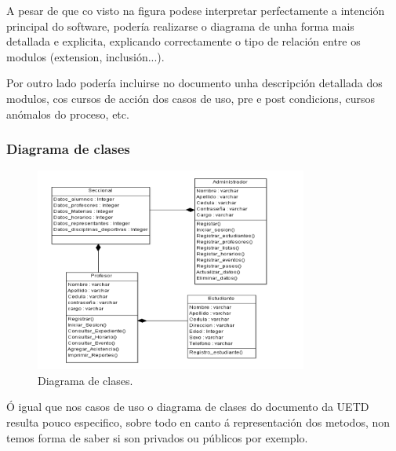 \documentclass[DIV=calc,paper=a4,fontsize=11pt,onecolumn]{scrartcl}	 %
\begin{document}
A pesar de que co visto na figura podese interpretar perfectamente a intención principal do software, podería realizarse o diagrama de unha forma mais detallada e explicita, explicando correctamente o tipo de relación entre os modulos (extension, inclusión...).

Por outro lado podería incluirse no documento unha descripción detallada dos modulos, cos cursos de acción dos casos de uso, pre e post condicions, cursos anómalos do proceso, etc.
\newpage
\subsubsection{Diagrama de clases}
\begin{figure}[h]
\centering
\includegraphics[width = 0.8\textwidth]{./figuras/clasesMal.png}
\caption{Diagrama de clases.}
\label{fig:clasesMal}
\end{figure}

Ó igual que nos casos de uso o diagrama de clases do documento da UETD \cite{UETD} resulta pouco especifico, sobre todo en canto á representación dos metodos, non temos forma de saber si son privados ou públicos por exemplo.
\newpage
\end{document}
